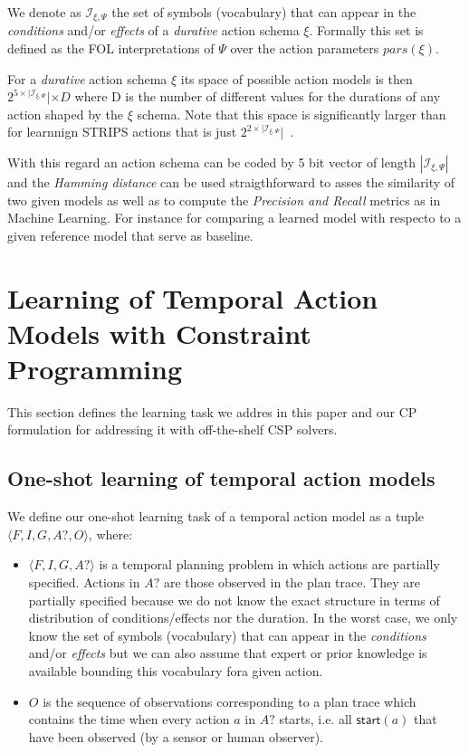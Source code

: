 \documentclass{ecai}
\newcommand{\tup}[1]{{\langle #1 \rangle}}
\newcommand{\start}{\mathsf{start}}%
\begin{document}
We denote as ${\mathcal I}_{\xi,\Psi}$ the set of symbols (vocabulary) that can appear in the {\em conditions} and/or {\em effects} of a {\em durative} action schema $\xi$. Formally this set is defined as the FOL interpretations of $\Psi$ over the action parameters $pars(\xi)$.

For a {\em durative} action schema $\xi$ its space of possible action models is then $2^{5\times|{\mathcal I}_{\xi,\Psi}}|\times D$ where D is the number of different values for the durations of any action shaped by the $\xi$ schema. Note that this space is significantly larger than for learnnign STRIPS actions that is just $2^{2\times|{\mathcal I}_{\xi,\Psi}}|$~\cite{yang2007learning}.

With this regard an action schema can be coded by 5 bit vector of length $|{\mathcal I}_{\xi,\Psi}|$ and the {\em Hamming distance} can be used straigthforward to asses the similarity of two given models as well as to compute the {\em Precision and Recall} metrics as in Machine Learning. For instance for comparing a learned model with respecto to a given reference model that serve as baseline.



\section{Learning of Temporal Action Models with Constraint Programming}
This section defines the learning task we addres in this paper and our CP formulation for addressing it with off-the-shelf CSP solvers.

\subsection{One-shot learning of temporal action models}
We define our one-shot learning task of a temporal action model as a tuple $\tup{F,I,G,A?,O}$, where:

\begin{itemize}
\item $\tup{F,I,G,A?}$ is a temporal planning problem in which actions are partially specified. Actions in $A?$ are those observed in the plan trace. They are partially specified because we do not know the exact structure in terms of distribution of conditions/effects nor the duration. In the worst case, we only know the set of symbols (vocabulary) that can appear in the {\em conditions} and/or {\em effects} but we can also assume that expert or prior knowledge is available bounding this vocabulary fora given action.
\item $O$ is the sequence of observations corresponding to a plan trace which contains the time when every action $a$ in $A?$ starts, i.e. all $\start(a)$ that have been observed (by a sensor or human observer).
\end{itemize}
\end{document}
